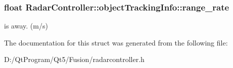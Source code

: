 \subsubsection[{range\+\_\+rate}]{\setlength{\rightskip}{0pt plus 5cm}float Radar\+Controller\+::object\+Tracking\+Info\+::range\+\_\+rate}\label{struct_radar_controller_1_1object_tracking_info_a52d996bdc367f363dada5af01960171b}

\begin{DoxyItemize}
\item is away. (m/s) 
\end{DoxyItemize}

The documentation for this struct was generated from the following file\+:\begin{DoxyCompactItemize}
\item 
D\+:/\+Qt\+Program/\+Qt5/\+Fusion/radarcontroller.\+h\end{DoxyCompactItemize}
